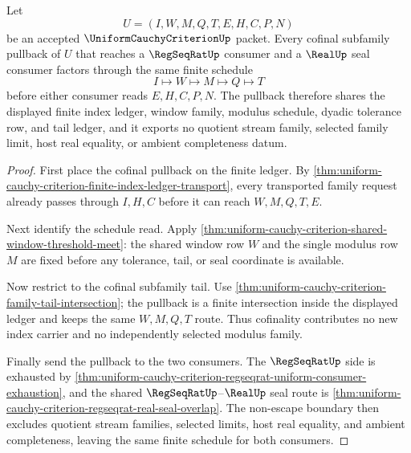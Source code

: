 \begin{theorem}
\label{thm:uniform-cauchy-criterion-shared-schedule-cofinal-pullback}
Let
$$
U=(I,W,M,Q,T,E,H,C,P,N)
$$
be an accepted $\UniformCauchyCriterionUp$ packet. Every cofinal subfamily pullback of $U$ that reaches a $\RegSeqRatUp$ consumer and a $\RealUp$ seal consumer factors through the same finite schedule
$$
I \longmapsto W \longmapsto M \longmapsto Q \longmapsto T
$$
before either consumer reads $E,H,C,P,N$. The pullback therefore shares the displayed finite index ledger, window family, modulus schedule, dyadic tolerance row, and tail ledger, and it exports no quotient stream family, selected family limit, host real equality, or ambient completeness datum.
\end{theorem}
\begin{proof}
First place the cofinal pullback on the finite ledger. By \autoref{thm:uniform-cauchy-criterion-finite-index-ledger-transport}, every transported family request already passes through $I,H,C$ before it can reach $W,M,Q,T,E$.

Next identify the schedule read. Apply \autoref{thm:uniform-cauchy-criterion-shared-window-threshold-meet}: the shared window row $W$ and the single modulus row $M$ are fixed before any tolerance, tail, or seal coordinate is available.

Now restrict to the cofinal subfamily tail. Use \autoref{thm:uniform-cauchy-criterion-family-tail-intersection}; the pullback is a finite intersection inside the displayed ledger and keeps the same $W,M,Q,T$ route. Thus cofinality contributes no new index carrier and no independently selected modulus family.

Finally send the pullback to the two consumers. The $\RegSeqRatUp$ side is exhausted by \autoref{thm:uniform-cauchy-criterion-regseqrat-uniform-consumer-exhaustion}, and the shared $\RegSeqRatUp$--$\RealUp$ seal route is \autoref{thm:uniform-cauchy-criterion-regseqrat-real-seal-overlap}. The non-escape boundary then excludes quotient stream families, selected limits, host real equality, and ambient completeness, leaving the same finite schedule for both consumers.
\end{proof}

